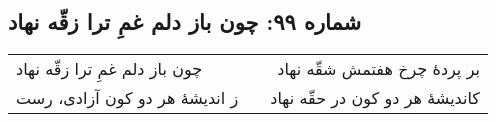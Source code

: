 \begin{center}
\section*{شماره ۹۹: چون باز دلم غمِ ترا زقّه نهاد}
\label{sec:099}
\begin{longtable}{l p{0.5cm} r}
چون باز دلم غمِ ترا زقّه نهاد
&&
بر پردهٔ چرخ هفتمش شقّه نهاد
\\
ز اندیشهٔ هر دو کون آزادی، رست
&&
کاندیشهٔ هر دو کون در حقّه نهاد
\\
\end{longtable}
\end{center}

